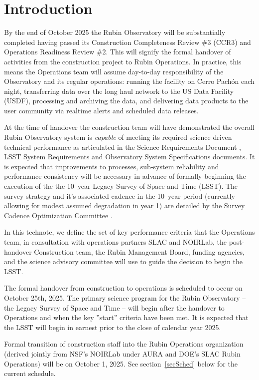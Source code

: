 \section{Introduction}

By the end of October 2025 the Rubin Observatory will be substantially completed having passed its Construction Completeness Review \#3 (CCR3) and Operations Readiness Review \#2.  This will signify the formal handover of activities from the construction project to Rubin Operations. In practice, this means the Operations team \cite[see][]{RDO-018} will assume day-to-day responsibility of the Observatory and its regular operations: running the facility on Cerro Pach\'{o}n each night, transferring data over the long haul network to the US Data Facility (USDF), processing and archiving the data, and delivering data products to the user community via realtime alerts and scheduled data releases. 

At the time of handover the construction team will have demonstrated the overall Rubin Observatory system is {\it capable} of meeting its required science driven technical performance as articulated in the Science Requirements Document \cite{LPM-17}, LSST System Requirements \cite{LSE-29} and Observatory System Specifications \cite{LSE-30} documents.  It is expected that improvements to processes, sub-system reliability and performance consistency will be necessary in advance of formally beginning the execution of the the 10--year Legacy Survey of Space and Time (LSST). The survey strategy and it's associated cadence in the 10--year period (currently allowing for modest assumed degradation in year 1) are detailed by the Survey Cadence Optimization Committee \cite[SCOC,][]{PSTN-056}. 

In this technote, we define the set of key performance criteria that the Operations team, in consultation with operations partners SLAC and NOIRLab, the post-handover Construction team, the Rubin Management Board, funding agencies, and the science advisory committee will use to guide the decision to begin the LSST. 

The formal handover from construction to operations is scheduled to occur on October 25th, 2025. The primary science program for the Rubin Observatory -- the Legacy Survey of Space and Time -- will begin after the handover to Operations and when the key ''start'' criteria have been met.  It is expected that the LSST will begin in earnest prior to the close of calendar year 2025.

Formal transition of construction staff into the Rubin Operations organization (derived jointly from NSF's NOIRLab under AURA and DOE's SLAC Rubin Operations) will be on October 1, 2025. See section~\ref{secSched} below for the current schedule.  
